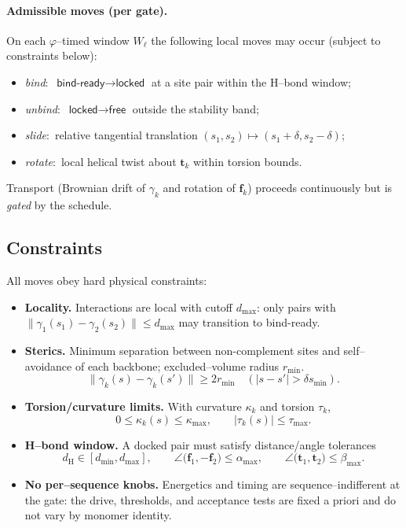 \documentclass[11pt]{article}
\begin{document}
\paragraph{Admissible moves (per gate).}
On each $\varphi$–timed window $W_\ell$ the following local moves may occur (subject to constraints below):
\begin{itemize}
\item \emph{bind}:\ $\textsf{bind-ready}\to\textsf{locked}$ at a site pair within the H–bond window;
\item \emph{unbind}:\ $\textsf{locked}\to\textsf{free}$ outside the stability band;
\item \emph{slide}:\ relative tangential translation $(s_1,s_2)\mapsto(s_1+\delta,s_2-\delta)$;
\item \emph{rotate}:\ local helical twist about $\mathbf{t}_k$ within torsion bounds.
\end{itemize}
Transport (Brownian drift of $\gamma_k$ and rotation of $\mathbf{f}_k$) proceeds continuously but is \emph{gated} by the schedule.

\subsection{Constraints}
All moves obey hard physical constraints:
\begin{itemize}
\item \textbf{Locality.} Interactions are local with cutoff $d_{\max}$: only pairs with $\|\gamma_1(s_1)-\gamma_2(s_2)\|\le d_{\max}$ may transition to \textsf{bind-ready}.
\item \textbf{Sterics.} Minimum separation between non-complement sites and self–avoidance of each backbone; excluded–volume radius $r_{\min}$.
\[
\|\gamma_k(s)-\gamma_k(s')\|\ge 2r_{\min}\quad (|s-s'|>\delta s_{\min}).
\]
\item \textbf{Torsion/curvature limits.} With curvature $\kappa_k$ and torsion $\tau_k$,
\[
0\le \kappa_k(s)\le \kappa_{\max},\qquad |\tau_k(s)|\le \tau_{\max}.
\]
\item \textbf{H–bond window.} A docked pair must satisfy distance/angle tolerances
\[
d_{\mathrm{H}}\in[d_{\min},d_{\max}],\qquad
\angle\!\big(\mathbf{f}_1,-\mathbf{f}_2\big)\le \alpha_{\max},\qquad
\angle\!\big(\mathbf{t}_1,\mathbf{t}_2\big)\le \beta_{\max}.
\]
\item \textbf{No per–sequence knobs.} Energetics and timing are sequence–indifferent at the gate: the drive, thresholds, and acceptance tests are fixed a priori and do not vary by monomer identity.
\end{itemize}
\end{document}
